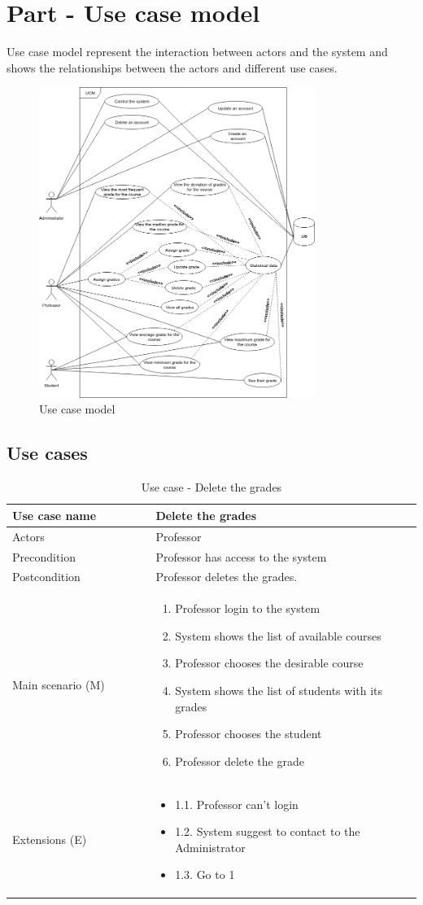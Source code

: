 \documentclass[12pt]{article}
\newcommand\tabularhead[1]{
\begin{table}[h]
  \caption{Use case - #1}
  \begin{tabular}{|p{0.35\linewidth}|p{0.65\linewidth}|}
    \hline
    \textbf{Use case name} & \textbf{#1} \\
    \hline}
\newcommand\addrow[2]{#1 &#2\\ \hline}
\newcommand\adddoublerow[2]{\begin{minipage}[t][][t]{2.5cm}#1\end{minipage}%
    &\begin{minipage}[t][][t]{\linewidth}
     \begin{itemize}\setlength{\itemsep}{0pt}%
        #2     
     \end{itemize}
     \end{minipage}\\ \hline}
\newcommand\addmulrow[2]{ \begin{minipage}[t][][t]{2.5cm}#1\end{minipage}%
     &\begin{minipage}[t][][t]{\linewidth}
      \begin{enumerate}\setlength{\itemsep}{0pt}%
        #2   
      \end{enumerate}
      \end{minipage}\\ \hline}
\newenvironment{usecase}{\tabularhead}
{\hline\end{tabular}\end{table}}
\begin{document}
\section{Part - Use case model}
Use case model represent the interaction between actors and the system and shows the relationships between the actors and different use cases.\cite{UCM}
\begin{figure}[h]
\centering
\includegraphics[width=0.8\textwidth]{UCM.png}
\caption{Use case model}
\end{figure}

\subsection{Use cases}
\begin{usecase}{Delete the grades}
    \addrow{Actors}{Professor}
    \addrow{Precondition}{Professor has access to the system}
    \addrow{Postcondition}{Professor deletes the grades.}
    \addmulrow{Main scenario (M)}{
        \item Professor login to the system
        \item System shows the list of available courses
        \item Professor chooses the desirable course
        \item System shows the list of students with its grades
        \item Professor chooses the student
        \item Professor delete the grade
    }
    \adddoublerow{Extensions (E)}{
        \item[] 1.1. Professor can't login
        \item[] 1.2. System suggest to contact to the Administrator
        \item[] 1.3. Go to 1
    }
\end{usecase}
\end{document}
